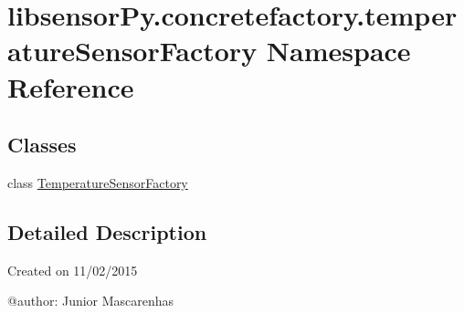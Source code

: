 \hypertarget{namespacelibsensorPy_1_1concretefactory_1_1temperatureSensorFactory}{}\section{libsensor\+Py.\+concretefactory.\+temperature\+Sensor\+Factory Namespace Reference}
\label{namespacelibsensorPy_1_1concretefactory_1_1temperatureSensorFactory}
\subsection*{Classes}
\begin{DoxyCompactItemize}
\item 
class \hyperlink{classlibsensorPy_1_1concretefactory_1_1temperatureSensorFactory_1_1TemperatureSensorFactory}{Temperature\+Sensor\+Factory}
\end{DoxyCompactItemize}


\subsection{Detailed Description}
\begin{DoxyVerb}Created on 11/02/2015

@author: Junior Mascarenhas
\end{DoxyVerb}
 